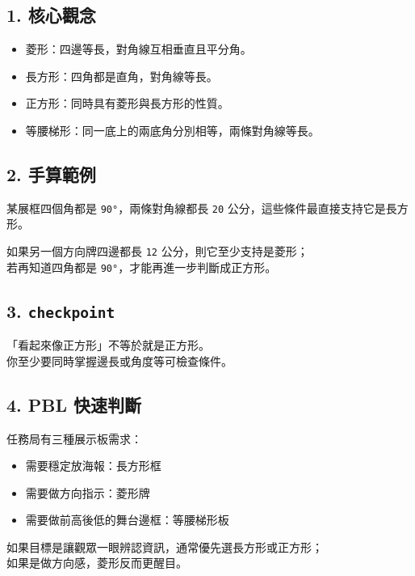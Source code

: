 \documentclass[
  chinese,
  12pt,
  a4paper,
  oneside]{article}
\providecommand{\tightlist}{%
  \setlength{\itemsep}{0pt}\setlength{\parskip}{0pt}}
\begin{document}
\subsection{1. 核心觀念}\label{ux6838ux5fc3ux89c0ux5ff5-5}

\begin{itemize}
\tightlist
\item
  菱形：四邊等長，對角線互相垂直且平分角。
\item
  長方形：四角都是直角，對角線等長。
\item
  正方形：同時具有菱形與長方形的性質。
\item
  等腰梯形：同一底上的兩底角分別相等，兩條對角線等長。
\end{itemize}

\subsection{2. 手算範例}\label{ux624bux7b97ux7bc4ux4f8b-9}

某展框四個角都是 \texttt{90°}，兩條對角線都長 \texttt{20}
公分，這些條件最直接支持它是長方形。

如果另一個方向牌四邊都長 \texttt{12} 公分，則它至少支持是菱形；\\
若再知道四角都是 \texttt{90°}，才能再進一步判斷成正方形。

\subsection{\texorpdfstring{3.
\texttt{checkpoint}}{3. checkpoint}}\label{checkpoint-10}

「看起來像正方形」不等於就是正方形。\\
你至少要同時掌握邊長或角度等可檢查條件。

\subsection{4. PBL 快速判斷}\label{pbl-ux5febux901fux5224ux65b7-5}

任務局有三種展示板需求：

\begin{itemize}
\tightlist
\item
  需要穩定放海報：長方形框
\item
  需要做方向指示：菱形牌
\item
  需要做前高後低的舞台邊框：等腰梯形板
\end{itemize}

如果目標是讓觀眾一眼辨認資訊，通常優先選長方形或正方形；\\
如果是做方向感，菱形反而更醒目。
\end{document}
